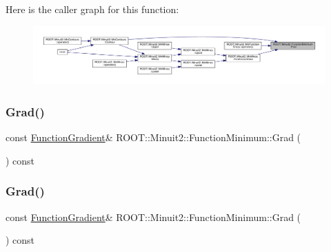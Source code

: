 Here is the caller graph for this function\+:\nopagebreak
\begin{figure}[H]
\begin{center}
\leavevmode
\includegraphics[width=350pt]{d4/dfb/classROOT_1_1Minuit2_1_1FunctionMinimum_a72aa9fd2b33f1bb56c5b053d536cc32c_icgraph}
\end{center}
\end{figure}
\mbox{\label{classROOT_1_1Minuit2_1_1FunctionMinimum_ac97896abe1c4625c519c2b07e4e9b670}} 
\subsubsection{\texorpdfstring{Grad()}{Grad()}\hspace{0.1cm}{\footnotesize\ttfamily [1/2]}}
{\footnotesize\ttfamily const \mbox{\hyperlink{classROOT_1_1Minuit2_1_1FunctionGradient}{Function\+Gradient}}\& R\+O\+O\+T\+::\+Minuit2\+::\+Function\+Minimum\+::\+Grad (\begin{DoxyParamCaption}{ }\end{DoxyParamCaption}) const\hspace{0.3cm}{\ttfamily [inline]}}

\mbox{\label{classROOT_1_1Minuit2_1_1FunctionMinimum_ac97896abe1c4625c519c2b07e4e9b670}} 
\subsubsection{\texorpdfstring{Grad()}{Grad()}\hspace{0.1cm}{\footnotesize\ttfamily [2/2]}}
{\footnotesize\ttfamily const \mbox{\hyperlink{classROOT_1_1Minuit2_1_1FunctionGradient}{Function\+Gradient}}\& R\+O\+O\+T\+::\+Minuit2\+::\+Function\+Minimum\+::\+Grad (\begin{DoxyParamCaption}{ }\end{DoxyParamCaption}) const\hspace{0.3cm}{\ttfamily [inline]}}


